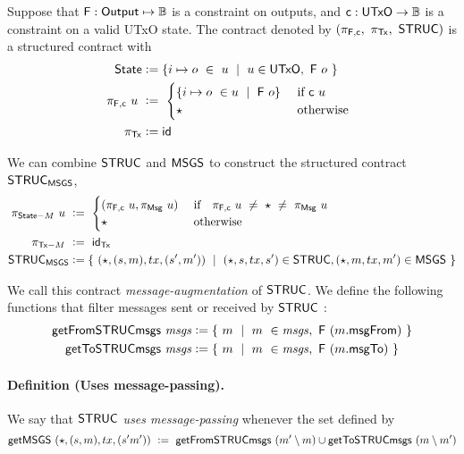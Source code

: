 Suppose that $\mathsf{F} : \mathsf{Output} \mapsto \mathbb{B}$ is a constraint on outputs, and
$\mathsf{c} : \mathsf{UTxO} \to \mathbb{B}$ is a constraint on a valid UTxO state. The contract
denoted by $(\pi_{\mathsf{F,c}},~\pi_{\mathsf{Tx}},~\mathsf{STRUC})$ is a structured contract with
\begin{align*}
  \mathsf{State} &\mathrel{\mathop:}= \{ i \mapsto o~\in~u ~\mid ~u \in \mathsf{UTxO},~\mathsf{F}~o~ \} \\
  \pi_{\mathsf{F,c}}~ u~&\mathrel{\mathop:}= ~\begin{cases}
    \{ i \mapsto o ~\in u~\mid ~\mathsf{F}~o \} & \text{ if } \mathsf{c}~u \\
    \star  & \text{ otherwise }
  \end{cases}~\\
  \pi_{\mathsf{Tx}} &\mathrel{\mathop:}= \mathsf{id}
\end{align*}

We can combine $\mathsf{STRUC}$ and $\mathsf{MSGS}$ to construct
the structured contract $\mathsf{STRUC}_{\mathsf{MSGS}}$,
\begin{align*}
  \pi_{\mathsf{State}-M}~u~&\mathrel{\mathop:}=~\begin{cases}
    (\pi_{\mathsf{F,c}}~u, \pi_{\mathsf{Msg}}~u) & \text{ if~~ } \pi_{\mathsf{F,c}}~u~\neq~\star~\neq~ \pi_{\mathsf{Msg}}~u \\
    \star & \text{ otherwise}
  \end{cases} \\
  \pi_{\mathsf{Tx}-M}~&\mathrel{\mathop:}=~\mathsf{id}_{\mathsf{Tx}} \\
  \mathsf{STRUC}_{\mathsf{MSGS}} &\mathrel{\mathop:}= \{~ (\star, (s, m), tx, (s', m'))~\mid~
  (\star, s, tx, s') \in \mathsf{STRUC}, (\star, m, tx, m') \in \mathsf{MSGS}~\}
\end{align*}

We call this contract \emph{message-augmentation} of $\mathsf{STRUC}$.
We define the following functions that filter messages sent or received by $\mathsf{STRUC}$ :
\begin{align*}
  \mathsf{getFromSTRUCmsgs} ~\mathit{msgs} & \mathrel{\mathop:}= \{~m~\mid~m~\in \mathit{msgs},~\mathsf{F}~(m.\mathsf{msgFrom})~\} \\
  \mathsf{getToSTRUCmsgs} ~\mathit{msgs} & \mathrel{\mathop:}= \{~m~\mid~m~\in \mathit{msgs},~\mathsf{F}~(m.\mathsf{msgTo})~\}
\end{align*}

\paragraph{Definition (Uses message-passing). }
\label{def:usesmp}
We say that $\mathsf{STRUC}$ \emph{uses message-passing} whenever the set defined by
\[ \mathsf{getMSGS}~(\star, (s, m), tx, (s' m'))~\mathrel{\mathop:}=~\mathsf{getFromSTRUCmsgs}~(m' \setminus m)
\cup \mathsf{getToSTRUCmsgs}~(m \setminus m')  \]

